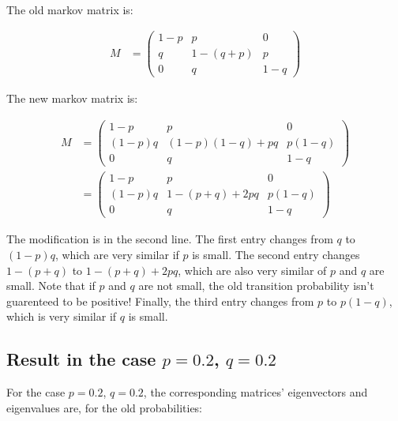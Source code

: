 \documentclass{article}
\begin{document}
\paragraph{}

The old markov matrix is:

\begin{align}
M & = \left( \begin{matrix}
1-p & p & 0 \\
q & 1 - (q + p) & p \\
0 & q & 1 - q 
\end{matrix} \right)
\end{align}

The new markov matrix is:

\begin{align}
M & = \left( \begin{matrix}
	1 - p & p & 0 \\
	(1 - p)q & (1 - p)(1 - q) + p q & p(1 - q) \\
	0 & q & 1 - q
\end{matrix} \right) \nonumber \\
  & = \left( \begin{matrix}
	1 - p & p & 0 \\
	(1 - p)q & 1 - (p + q) + 2 p q & p(1 - q) \\
	0 & q & 1 - q
\end{matrix} \right)
\end{align}

The modification is in the second line.
The first entry changes from $q$ to $(1 - p)q$, which are very similar if $p$ is small.
The second entry changes $1 - (p + q)$ to $1 - (p + q) + 2 p q$, which are also very 
	similar of $p$ and $q$ are small.
Note that if $p$ and $q$ are not small, the old transition probability isn't
	 guarenteed to be positive!
Finally, the third entry changes from $p$ to $p(1 - q)$, which is very similar
	if $q$ is small.

\subsection{Result in the case $p = 0.2$, $q = 0.2$}

For the case $p = 0.2$, $q = 0.2$, the corresponding matrices' eigenvectors and eigenvalues
	are, for the old probabilities:
\end{document}
